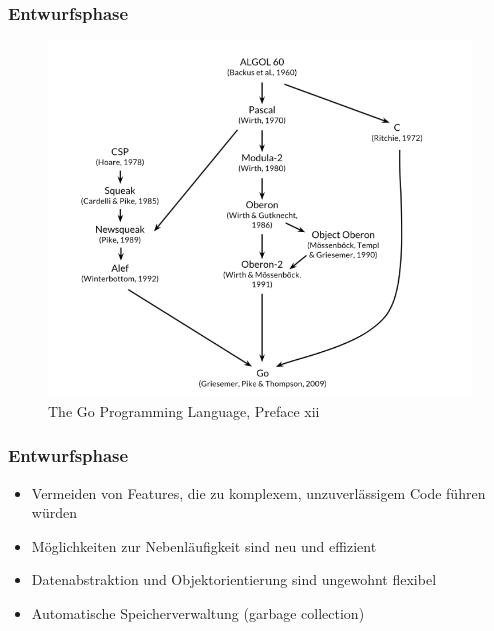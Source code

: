 \documentclass{beamer}
\begin{document}
\begin{frame}
\frametitle{Entwurfsphase}

\begin{figure}
\centering
\includegraphics[scale=0.45]{origin.png}
\caption{The Go Programming Language,  Preface xii}
\end{figure}

\end{frame}

\begin{frame}
\frametitle{Entwurfsphase}

\begin{itemize}
\setlength{\itemsep}{40pt}
\item Vermeiden von Features, die zu komplexem, unzuverl\"assigem Code führen w\"urden
\item M\"oglichkeiten zur Nebenl\"aufigkeit sind neu und effizient
\item Datenabstraktion und Objektorientierung sind ungewohnt flexibel
\item Automatische Speicherverwaltung (garbage collection)
\end{itemize}

\end{frame}

\end{document}

